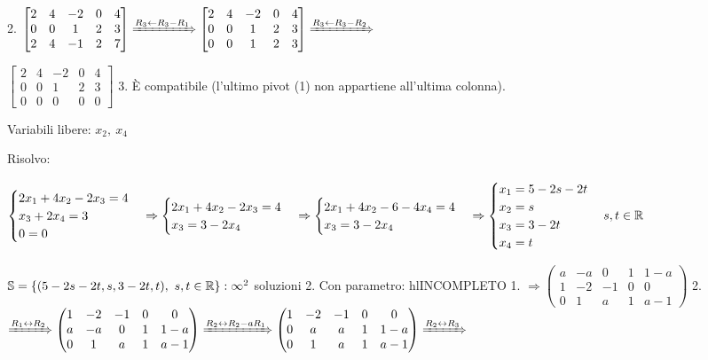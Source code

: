 \documentclass{article}
\begin{document}
   2.  $\begin{bmatrix}
         2&4&-2&0&4\\
         0&0&1&2&3\\
         2&4&-1&2&7
       \end{bmatrix}\xRightarrow{R_3\leftarrow R_3-R_1}
       \begin{bmatrix}
         2&4&-2&0&4\\
         0&0&1&2&3\\
         0&0&1&2&3
       \end{bmatrix}\xRightarrow{R_3\leftarrow R_3-R_2}$

       $\begin{bmatrix}
         2&4&-2&0&4\\
         0&0&1&2&3\\
         0&0&0&0&0
       \end{bmatrix}$
   3. È compatibile (l'ultimo pivot (1) non appartiene all'ultima colonna).

      Variabili libere: $x_2,\ x_4$

      Risolvo:

      $\begin{cases}
       2x_1+4x_2-2x_3=4\\
       x_3+2x_4=3\\
       0=0
      \end{cases}\Rightarrow
      \begin{cases}
       2x_1+4x_2-2x_3=4\\
       x_3=3-2x_4
      \end{cases}\Rightarrow
      \begin{cases}
       2x_1+4x_2-6-4x_4=4\\
       x_3=3-2x_4
      \end{cases}\Rightarrow
      \begin{cases}
       x_1=5-2s-2t\\
       x_2=s\\
       x_3=3-2t\\
       x_4=t
      \end{cases}s,t\in\mathbb{R}$

      $\mathbb{S}=\{(5-2s-2t,s,3-2t,t),\ s,t\in\R\}:\infty^2$ soluzioni
2. Con parametro: hl{INCOMPLETO}
    1. $\Rightarrow\begin{pmatrix}
         a&-a&0&1&1-a\\
         1&-2&-1&0&0\\
         0&1&a&1&a-1
       \end{pmatrix}$
    2. $\xRightarrow{R_1\leftrightarrow R_2}
       \begin{pmatrix}
         1&-2&-1&0&0\\
         a&-a&0&1&1-a\\
         0&1&a&1&a-1
       \end{pmatrix}\xRightarrow{R_2\leftrightarrow R_2-aR_1}
       \begin{pmatrix}
         1&-2&-1&0&0\\
         0&a&a&1&1-a\\
         0&1&a&1&a-1
       \end{pmatrix}\xRightarrow{R_2\leftrightarrow R_3}$
\end{document}
